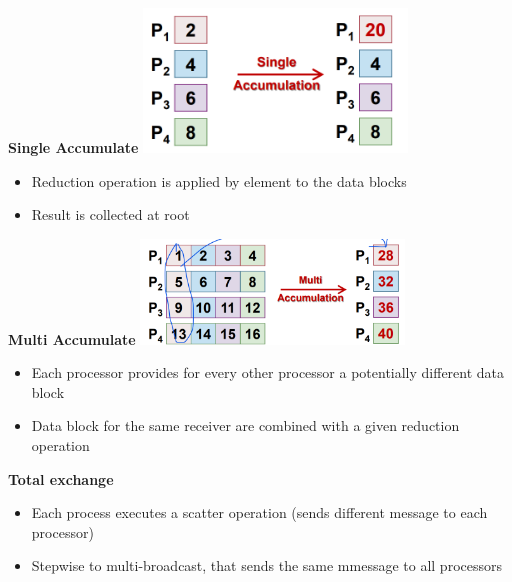 \documentclass[10pt, landscape]{article}
\begin{document}
\begin{multicols}{4}
\textbf{Single Accumulate}
\includegraphics*[width=7cm]{single_acc.png}
\begin{itemize}
    \item Reduction operation is applied by element to the data blocks 
    \item Result is collected at root
\end{itemize}

\textbf{Multi Accumulate}
\includegraphics*[width=7cm]{multi_acc.png}
\begin{itemize}
    \item Each processor provides for every other processor a potentially different data block 
    \item Data block for the same receiver are combined with a given reduction operation
\end{itemize}

\textbf{Total exchange}
\begin{itemize}
    \item Each process executes a scatter operation (sends different message to each processor)
    \item Stepwise to multi-broadcast, that sends the same mmessage to all processors
\end{itemize}


\end{multicols}
\end{document}
